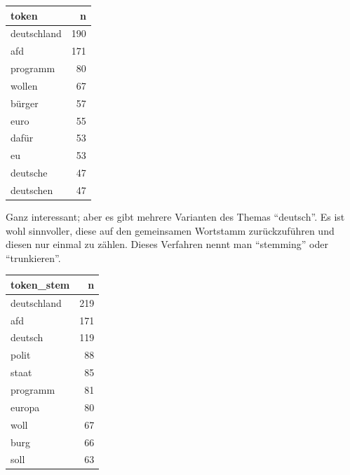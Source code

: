 \documentclass[12pt,ngerman,]{book}
\makeatletter
\newenvironment{Shaded}{\begin{snugshade}}{\end{snugshade}}
\newcommand{\KeywordTok}[1]{\textcolor[rgb]{0.13,0.29,0.53}{\textbf{{#1}}}}
\newcommand{\DataTypeTok}[1]{\textcolor[rgb]{0.13,0.29,0.53}{{#1}}}
\newcommand{\DecValTok}[1]{\textcolor[rgb]{0.00,0.00,0.81}{{#1}}}
\newcommand{\StringTok}[1]{\textcolor[rgb]{0.31,0.60,0.02}{{#1}}}
\newcommand{\OtherTok}[1]{\textcolor[rgb]{0.56,0.35,0.01}{{#1}}}
\newcommand{\NormalTok}[1]{{#1}}
\newenvironment{kframe}{%
\medskip{}
\setlength{\fboxsep}{.8em}
 \def\at@end@of@kframe{}%
 \ifinner\ifhmode%
  \def\at@end@of@kframe{\end{minipage}}%
  \begin{minipage}{\columnwidth}%
 \fi\fi%
 \def\FrameCommand##1{\hskip\@totalleftmargin \hskip-\fboxsep
 \colorbox{shadecolor}{##1}\hskip-\fboxsep
     \hskip-\linewidth \hskip-\@totalleftmargin \hskip\columnwidth}%
 \MakeFramed {\advance\hsize-\width
   \@totalleftmargin\z@ \linewidth\hsize
   \@setminipage}}%
 {\par\unskip\endMakeFramed%
 \at@end@of@kframe}
\renewenvironment{Shaded}{\begin{kframe}}{\end{kframe}}
\makeatother
\begin{document}
\begin{Shaded}
\end{Shaded}

\begin{tabular}{l|r}
\hline
token & n\\
\hline
deutschland & 190\\
\hline
afd & 171\\
\hline
programm & 80\\
\hline
wollen & 67\\
\hline
bürger & 57\\
\hline
euro & 55\\
\hline
dafür & 53\\
\hline
eu & 53\\
\hline
deutsche & 47\\
\hline
deutschen & 47\\
\hline
\end{tabular}

Ganz interessant; aber es gibt mehrere Varianten des Themas ``deutsch''.
Es ist wohl sinnvoller, diese auf den gemeinsamen Wortstamm
zurückzuführen und diesen nur einmal zu zählen. Dieses Verfahren nennt
man ``stemming'' oder ``trunkieren''.

\begin{Shaded}
\end{Shaded}

\begin{tabular}{l|r}
\hline
token\_stem & n\\
\hline
deutschland & 219\\
\hline
afd & 171\\
\hline
deutsch & 119\\
\hline
polit & 88\\
\hline
staat & 85\\
\hline
programm & 81\\
\hline
europa & 80\\
\hline
woll & 67\\
\hline
burg & 66\\
\hline
soll & 63\\
\hline
\end{tabular}
\end{document}
